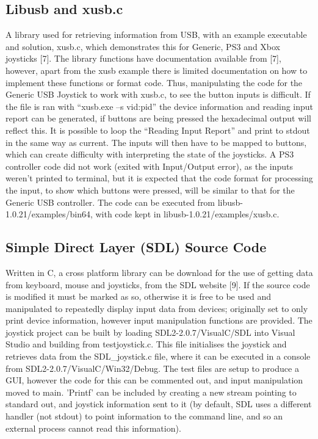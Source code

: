 \documentclass[12pt,openany,a4paper]{book}
\begin{document}
{\subsection{Libusb and xusb.c}
A library used for retrieving information from USB, with an example executable and solution, xusb.c, which demonstrates this for Generic, PS3 and Xbox joysticks [7]. The library functions have documentation available from [7], however, apart from the xusb example there is limited documentation on how to implement these functions or format code. Thus, manipulating the code for the Generic USB Joystick to work with xusb.c, to see the button inputs is difficult. If the file is ran with “xusb.exe –s vid:pid” the device information and reading input report can be generated, if buttons are being pressed the hexadecimal output will reflect this. It is possible to loop the “Reading Input Report” and print to stdout in the same way as current. The inputs will then have to be mapped to buttons, which can create difficulty with interpreting the state of the joysticks. A PS3 controller code did not work (exited with Input/Output error), as the inputs weren’t printed to terminal, but it is expected that the code format for processing the input, to show which buttons were pressed, will be similar to that for the Generic USB controller. The code can be executed from libusb-1.0.21/examples/bin64, with code kept in libusb-1.0.21/examples/xusb.c.

\subsection{Simple Direct Layer (SDL) Source Code}
Written in C, a cross platform library can be download for the use of getting data from keyboard, mouse and joysticks, from the SDL website [9]. If the source code is modified it must be marked as so, otherwise it is free to be used and manipulated to repeatedly display input data from devices; originally set to only print device information, however input manipulation functions are provided. The joystick project can be built by loading SDL2-2.0.7/VisualC/SDL into Visual Studio and building from testjoystick.c. This file initialises the joystick and retrieves data from the SDL\_joystick.c file, where it can be executed in a console from SDL2-2.0.7/VisualC/Win32/Debug. The test files are setup to produce a GUI, however the code for this can be commented out, and input manipulation moved to main. 'Printf' can be included by creating a new stream pointing to standard out, and joystick information sent to it (by default, SDL uses a different handler (not stdout) to point information to the command line, and so an external process cannot read this information).


}
\end{document}
